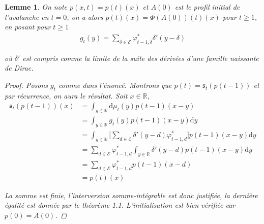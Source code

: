 \documentclass{article}
\newtheorem{lemma}[theorem]{Lemme}
\begin{document}
\begin{lemma}
	On note $p(x,t) = p(t)(x)$ et  $A(0)$ est le profil initial de l'avalanche en $t=0$, on a alors $p(t)(x) = \Phi(A(0))(t)(x)$ pour $t\geq 1$, en posant pour $t\geq 1$
	\begin{align*}
		g_t(y) = \sum_{\delta \in \mathcal{E}}\varphi_{t-1,\delta}^*\delta'(y-\delta)
	\end{align*}

	où $\delta'$ est compris comme la limite de la suite des dérivées d'une famille naissante de Dirac. 
	\begin{proof}
		Posons $g_t$ comme dans l'énoncé. Montrons que $p(t) = \mathfrak{s}_t(p(t-1))$ et par récurrence, on aura le résultat. Soit $x\in\mathbb{R}$,  
		\begin{align*}
			\mathfrak{s}_t(p(t-1))(x) &= \int_{y\in\mathbb{R}}\mathrm{d}\mu_t(y)p(t-1)(x-y)\\
						  &= \int_{y\in\mathbb{R}} g_t(y)p(t-1)(x-y)\mathrm{d}y\\
						  &= \int_{y\in\mathbb{R}} \bigg [\sum_{d\in \mathcal{E}}\delta'(y-d)\varphi^*_{t-1,d}\bigg]p(t-1)(x-y)\mathrm{d}y\\
						  &= \sum_{d\in\mathcal{E}}\varphi^*_{t-1,d} \int_{y\in\mathbb{R}}\delta'(y-d) p(t-1)(x-y)\mathrm{d}y\\
						  &= \sum_{d\in\mathcal{E}}\varphi^*_{t-1,d} p(t-1)(x-d) \\
						  &= p(t)(x)
		\end{align*}

		La somme est finie, l'interversion somme-intégrable est donc justifiée, la dernière égalité est donnée par le théorème 1.1. L'initialisation est bien vérifiée car $p(0) = A(0)$.

	\end{proof}
\end{lemma}
\end{document}

